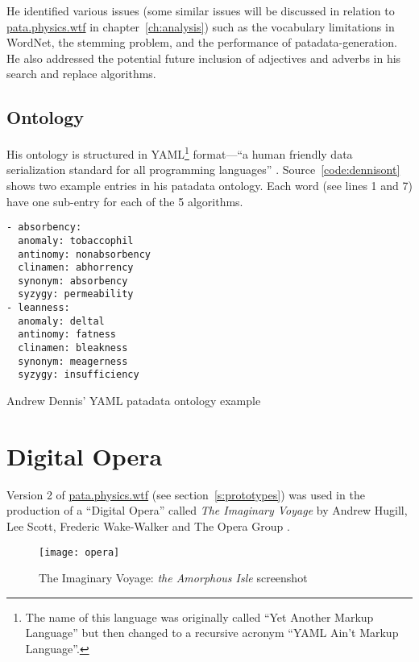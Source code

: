 He identified various issues (some similar issues will be discussed in relation to \url{pata.physics.wtf} in chapter~\ref{ch:analysis}) such as the vocabulary limitations in WordNet, the stemming problem, and the performance of patadata-generation. He also addressed the potential future inclusion of adjectives and adverbs in his search and replace algorithms.


\subsection{Ontology}

His ontology is structured in \ac{YAML}\footnote{The name of this language was originally called ``Yet Another Markup Language'' but then changed to a recursive acronym ``YAML Ain't Markup Language''.} format---``a human friendly data serialization standard for all programming languages'' \autocite{Evans2016}. Source~\ref{code:dennisont} shows two example entries in his patadata ontology. Each word (see lines 1 and 7) have one sub-entry for each of the 5 algorithms.

\begin{listing}[!htbp] %
  \begin{verbatim}
- absorbency:
  anomaly: tobaccophil
  antinomy: nonabsorbency
  clinamen: abhorrency
  synonym: absorbency
  syzygy: permeability
- leanness:
  anomaly: deltal
  antinomy: fatness
  clinamen: bleakness
  synonym: meagerness
  syzygy: insufficiency
  \end{verbatim}
\caption[Dennis' patadata ontology]{Andrew Dennis' \ac{YAML} patadata ontology example}
\label{code:dennisont}
\end{listing}


\section{Digital Opera}
\label{s:opera}

Version 2 of \url{pata.physics.wtf} (see section~\ref{s:prototypes}) was used in the production of a ``Digital Opera'' called \textit{The Imaginary Voyage} \autocite{Hugill2014,Hugill2013a} by Andrew Hugill, Lee Scott, Frederic Wake-Walker and The Opera Group \autocite{Mahogany2016}.

\begin{figure}[!htbp]
  \centering
  \texttt{[image: opera]}
\caption[Imaginary Voyage: \textit{Amorphous Isle}]{The Imaginary Voyage: \textit{the Amorphous Isle} screenshot}
\label{img:opera}
\end{figure}

